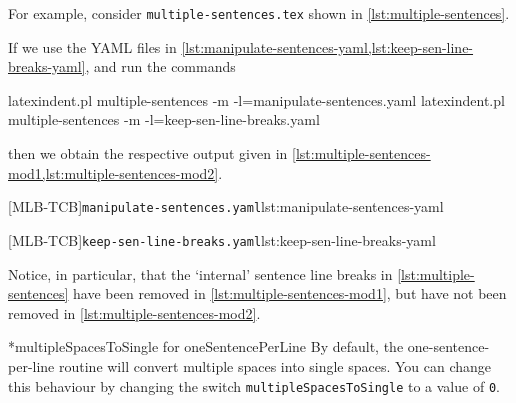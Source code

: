  \begin{example}
 For example, consider \texttt{multiple-sentences.tex} shown in
 \cref{lst:multiple-sentences}.


 If we use the YAML files in
 \cref{lst:manipulate-sentences-yaml,lst:keep-sen-line-breaks-yaml}, and run the commands
  
 \begin{widepage}

  \begin{commandshell}
latexindent.pl multiple-sentences -m -l=manipulate-sentences.yaml
latexindent.pl multiple-sentences -m -l=keep-sen-line-breaks.yaml
\end{commandshell}

 \end{widepage}
 then we obtain the respective output given in
 \cref{lst:multiple-sentences-mod1,lst:multiple-sentences-mod2}.

 \begin{cmhtcbraster}
  [MLB-TCB]{\texttt{manipulate-sentences.yaml}}{lst:manipulate-sentences-yaml}
 \end{cmhtcbraster}

 \begin{cmhtcbraster}
  [MLB-TCB]{\texttt{keep-sen-line-breaks.yaml}}{lst:keep-sen-line-breaks-yaml}
 \end{cmhtcbraster}

 Notice, in particular, that the `internal' sentence line breaks in
 \cref{lst:multiple-sentences} have been removed in \cref{lst:multiple-sentences-mod1},
 but have not been removed in \cref{lst:multiple-sentences-mod2}.
 \end{example}

 *{multipleSpacesToSingle for oneSentencePerLine} By default, the
 one-sentence-per-line routine will convert multiple spaces into single spaces. You can
 change this behaviour by changing the switch \texttt{multipleSpacesToSingle} to a value
 of \texttt{0}.

